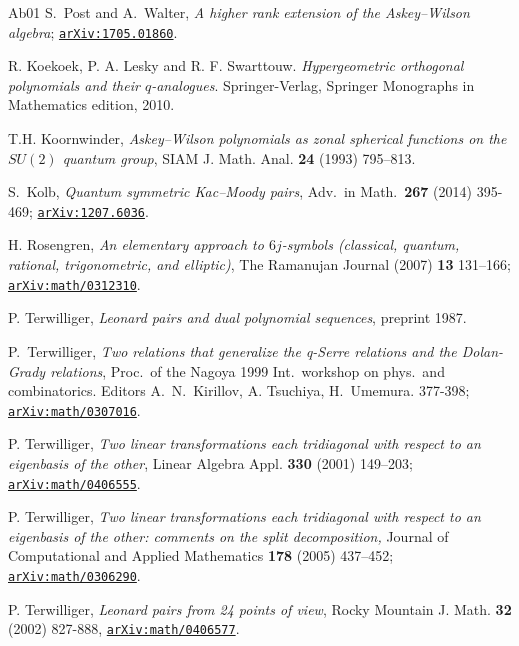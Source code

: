 \documentclass[11pt]{amsart}
\numberwithin{equation}{section}
\numberwithin{equation}{section}
\begin{document}
\begin{thebibliography}{Ab01}
 S.~Post and A.~Walter, 
{\it A higher rank extension of the Askey--Wilson algebra}; \href{https://arxiv.org/abs/0904.2889}{\texttt{arXiv:1705.01860}}.

 R. Koekoek, P. A. Lesky and R. F. Swarttouw. \textit{Hypergeometric orthogonal polynomials and their {$q$}-analogues}. Springer-Verlag, Springer Monographs in Mathematics edition, 2010.

T.H. Koornwinder, {\it Askey–Wilson polynomials as zonal spherical functions on the $SU(2)$ quantum group},
SIAM J. Math. Anal. {\bf 24} (1993) 795–813.


S.\ Kolb, \textit{Quantum symmetric Kac–Moody pairs}, Adv.\ in Math.\ {\bf 267} (2014) 395-469; \href{https://arxiv.org/abs/1207.6036}
{\tt arXiv:1207.6036}.

 H. Rosengren, 
\textit{An elementary approach to $6j$-symbols (classical, quantum, rational, trigonometric, and elliptic)},
The Ramanujan Journal (2007)  {\bf 13}  131--166; \href{https://arxiv.org/abs/math/0312310}{\tt arXiv:math/0312310}.

P. Terwilliger, {\it Leonard pairs and dual polynomial sequences}, preprint 1987.

P.\ Terwilliger, {\it Two relations that generalize the q-Serre
	relations and the Dolan-Grady relations}, Proc.\ of the Nagoya 1999 Int.\ workshop on phys.\ and combinatorics. Editors A.\ N.\ Kirillov, A. Tsuchiya, H.\ Umemura. 377-398; 
    \href{https://arxiv.org/abs/math/0307016}
    {\tt  arXiv:math/0307016}.


P. Terwilliger,
\textit{Two linear transformations each tridiagonal with respect to an eigenbasis of the other},
Linear Algebra Appl. {\bf 330} (2001) 149--203;  \href{https://arxiv.org/abs/math/0406555}{\tt arXiv:math/0406555}.

P. Terwilliger,
\textit{Two linear transformations each tridiagonal with respect to an eigenbasis of the other: comments on the split decomposition,}
Journal of Computational and Applied Mathematics {\bf 178} (2005) 437--452;  \href{https://arxiv.org/abs/math/0306290}
{\tt  	arXiv:math/0306290}.

P. Terwilliger, {\it Leonard pairs from 24 points of view}, Rocky Mountain J. Math. {\bf 32} (2002) 827-888, \href{https://arxiv.org/abs/math/0406577}{\tt arXiv:math/0406577}.


\end{thebibliography}
\end{document}
